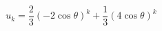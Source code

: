 \begin{displaymath}
 u_k = \frac{2}{3}(-2\cos \theta)^k + \frac{1}{3}(4\cos \theta)^k
\end{displaymath}
